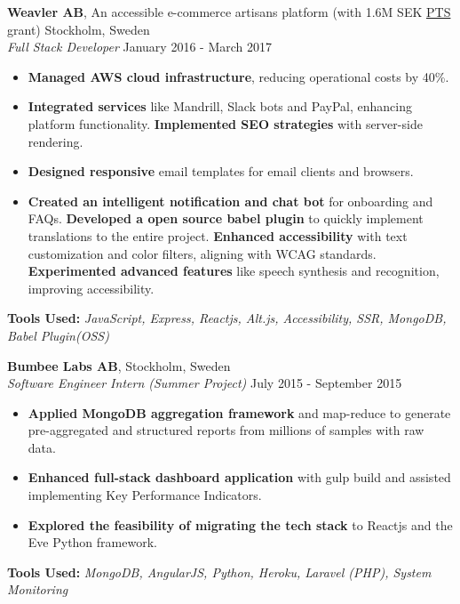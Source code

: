 \begin{minipage}[t]{0.61\textwidth}
\vspace{1em}

\noindent
\textbf{\Large Weavler AB}, An accessible e-commerce artisans platform (with 1.6M SEK \href{https://pts.se}{\color{blue}PTS} grant) \hfill Stockholm, Sweden\\
\textit{Full Stack Developer} \hfill January 2016 - March 2017
\begin{itemize}
\setlength{\itemsep}{0.5em}
    \item \textbf{Managed AWS cloud infrastructure}, reducing operational costs by 40\%.
    \item \textbf{Integrated services} like Mandrill, Slack bots and PayPal, enhancing platform functionality.
    \textbf{Implemented SEO strategies} with server-side rendering.     \item \textbf{Designed responsive} email templates for email clients and browsers.

    \item \textbf{Created an intelligent notification and chat bot} for onboarding and FAQs.
    \textbf{Developed a open source babel plugin} to quickly implement translations to the entire project.
    \textbf{Enhanced accessibility} with text customization and color filters, aligning with WCAG standards.
    \textbf{Experimented advanced features} like speech synthesis and recognition, improving accessibility.
\end{itemize}
\vspace{0.2em}
\textbf{ Tools Used:} \textit{JavaScript, Express, Reactjs, Alt.js, Accessibility, SSR, MongoDB, Babel Plugin(OSS)}

\vspace{1em}

\noindent
\textbf{\Large Bumbee Labs AB}, \hfill Stockholm, Sweden\\
\textit{Software Engineer Intern (Summer Project)} \hfill July 2015 - September 2015
\begin{itemize}
\setlength{\itemsep}{0.5em}
    \item \textbf{Applied MongoDB aggregation framework} and map-reduce to generate pre-aggregated and structured reports from millions of samples with raw data.
    \item \textbf{Enhanced full-stack dashboard application} with gulp build and assisted implementing Key Performance Indicators.
    \item \textbf{Explored the feasibility of migrating the tech stack} to Reactjs and the Eve Python framework.
\end{itemize}
\vspace{0.2em}
\textbf{ Tools Used:} \textit{MongoDB, AngularJS, Python, Heroku, Laravel (PHP), System Monitoring}

\vfill

\end{minipage}
